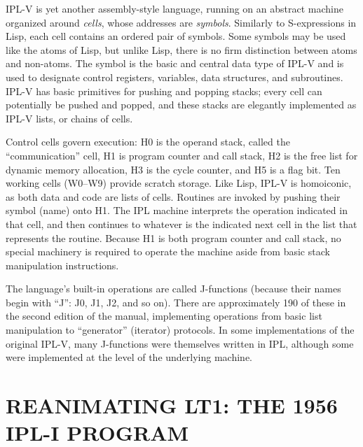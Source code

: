 \documentclass{IEEEcsmag}
\begin{document}
IPL-V is yet another assembly-style language, running on an abstract machine
organized around \textit{cells}, whose addresses are \textit{symbols}.
Similarly to S-expressions in Lisp, each cell contains an ordered pair of 
symbols.  Some symbols may be used like the atoms of Lisp, but unlike
Lisp, there is no firm distinction between atoms and non-atoms.
The symbol is the basic and central data type of IPL-V
and is used to designate control registers, variables, data structures,
and subroutines.
IPL-V has basic primitives for pushing and popping stacks;
every cell can potentially be pushed and popped, and these stacks are elegantly implemented as IPL-V lists,
or chains of cells.

Control cells
govern execution: H0 is the operand stack, called the
``communication'' cell, H1 is program counter and call
stack, H2 is the free list for dynamic memory allocation, H3 is
the cycle counter, and H5 is a flag bit. Ten working cells (W0--W9)
provide scratch storage. Like Lisp, IPL-V is homoiconic, as both
data and code are lists of cells. 
Routines
are invoked by pushing their symbol (name) onto H1. The IPL machine
interprets the operation indicated in that cell, and then continues to
whatever is the indicated next cell in the list that represents the routine. 
Because H1 is both
program counter and call stack, no special machinery is required to
operate the machine aside from basic stack manipulation instructions.

The language's built-in operations are called J-functions (because
their names begin with ``J'': J0, J1, J2, and so on). There are
approximately 190 of these in the second edition of the
manual, implementing operations from basic list
manipulation to ``generator'' (iterator) protocols. In some implementations
of the original
IPL-V, many J-functions were themselves written in IPL, although some
were implemented at the level of the underlying machine.

\section{REANIMATING LT1: THE 1956 IPL-I PROGRAM}
\label{sec:lt1}

\end{document}
